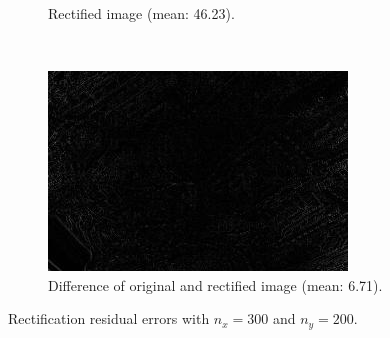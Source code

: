 \begin{figure}[h]
\begin{subfigure}[b]{0.49\textwidth}
    \caption{Rectified image (mean: 46.23).}
    \label{fig:rect_rw}
  \end{subfigure}
  \\
  \begin{subfigure}[b]{0.7\textwidth}
    \includegraphics[width=\textwidth]{figures/rect_rdiff.jpg} 
    \caption{Difference of original and rectified image (mean: 6.71).}
    \label{fig:rect_rdiff}
  \end{subfigure}
  \caption{Rectification residual errors with $n_x = 300$ and $n_y = 200$.}
  \label{fig:rect}
\end{figure}

